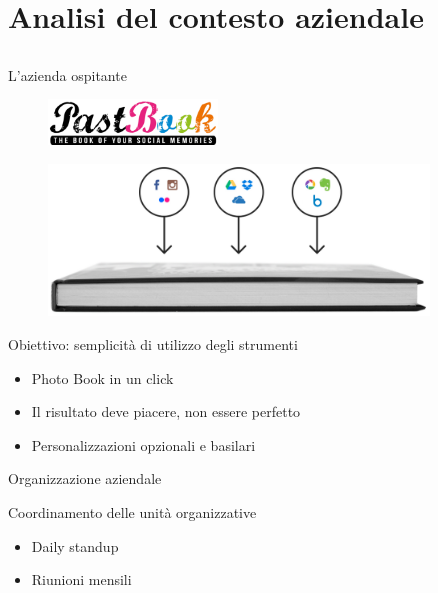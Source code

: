 \section{Analisi del contesto aziendale}
	\subsection{}
		\begin{frame}{L'azienda ospitante}
			\begin{figure}[H]
				\centering
				\includegraphics[width=0.4\textwidth]{capitolo_1/immagini/logo_pastbook.png}
			\end{figure}
			\begin{figure}[H]
				\centering
				\includegraphics[width=0.9\textwidth]{capitolo_1/immagini/photo_book_one_click.png}
			\end{figure}
		\end{frame}
		\begin{frame}{Obiettivo: semplicità di utilizzo degli strumenti}
			\begin{itemize}
				\item Photo Book in un click
				\item Il risultato deve piacere, non essere perfetto
				\item Personalizzazioni opzionali e basilari
			\end{itemize}
			
		\end{frame}
		\begin{frame}{Organizzazione aziendale}
			
			\begin{block}{Coordinamento delle unità organizzative}
				\begin{itemize}
					\item Daily standup
					\item Riunioni mensili
				\end{itemize}
			\end{block}
		\end{frame}
